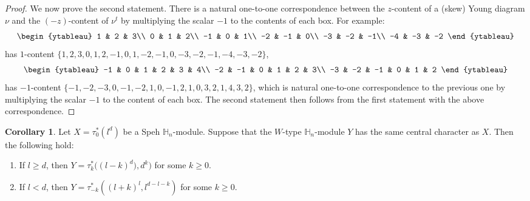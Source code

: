 \documentclass[11pt]{amsart}
\numberwithin{equation}{section}
\theoremstyle{definition}
\newtheorem{corollary}[thm]{Corollary}
\begin{document}
\begin{proof}

We now prove the second statement. There is a natural one-to-one correspondence between the $z$-content of a (skew) Young diagram $\nu$ and the $(-z)$-content of $\nu^{t}$ by multiplying the scalar $-1$ to the contents of each box. For example:
\[
\begin{ytableau}
    1 & 2 & 3\\
    0 & 1 & 2\\
    -1 & 0 & 1\\
    -2 & -1 & 0\\
    -3 & -2 & -1\\
    -4 & -3 & -2
\end{ytableau}
\]
has $1$-content $\{1,2,3,0,1,2,-1,0,1,-2,-1,0,-3,-2,-1,-4,-3,-2\}$, 
\[ \begin{ytableau}
    -1 & 0 & 1 & 2 & 3 & 4\\
    -2 & -1 & 0 & 1 & 2 & 3\\
    -3 & -2 & -1 & 0 & 1 & 2
\end{ytableau}
\]
has $-1$-content $\{-1,-2,-3,0,-1,-2,1,0,-1,2,1,0,3,2,1,4,3,2\}$, which is natural one-to-one correspondence to the previous one by multiplying the scalar $-1$ to the content of each box. The second statement then follows from the first statement with the above correspondence.
\end{proof}

\begin{corollary}\label{cor: shape for same central character}
    Let $X=\tau_{0}^{*}(l^{d})$ be a Speh $\mathbb{H}_{n}$-module. Suppose that the $W$-type $\mathbb H_n$-module $Y$ has the same central character as $X$. Then the following hold:
    \begin{enumerate}
     \item If $l\geq d$, then  $Y=\tau_{k}^{*}\big((l-k)^{d}),d^{k}\big)$ for some $k\geq 0$. 
     \item If $l<d$, then $Y=\tau_{-k}^*((l+k)^l, l^{d-l-k})$ for some $k \geq 0$.
     \end{enumerate}
\end{corollary}
\end{document}
